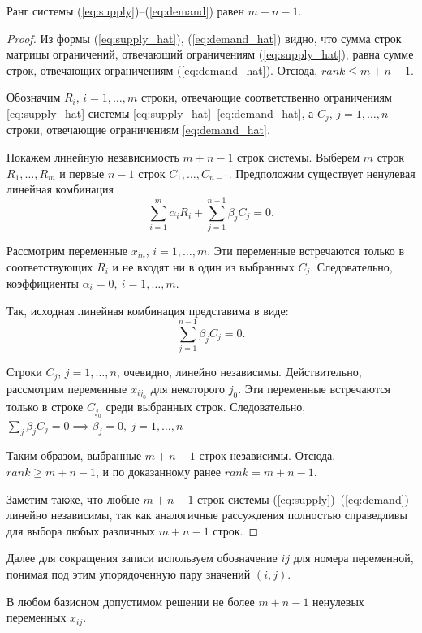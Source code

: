 \documentclass[12pt]{article}
\theoremstyle{definition}
\theoremstyle{plain}
\theoremstyle{definition}
\begin{document}
\begin{assertionlocal}\label{assert:rank}
Ранг системы (\ref{eq:supply})--(\ref{eq:demand}) равен $m + n - 1$.
\end{assertionlocal}
\begin{proof}
  Из формы (\ref{eq:supply_hat}), (\ref{eq:demand_hat}) видно,
  что сумма строк матрицы ограничений, отвечающий ограничениям (\ref{eq:supply_hat}),
  равна сумме строк, отвечающих ограничениям (\ref{eq:demand_hat}). Отсюда, $rank \leq m + n - 1$.

Обозначим $R_i$, $i=1,\dots,m$ строки, отвечающие соответственно ограничениям \eqref{eq:supply_hat}
системы \eqref{eq:supply_hat}--\eqref{eq:demand_hat}, а $C_j$, $j=1,\dots,n$ ---
строки, отвечающие ограничениям \eqref{eq:demand_hat}.

Покажем линейную независимость $m + n - 1$ строк системы.
Выберем $m$ строк $R_1,\dots,R_m$ и первые $n-1$ строк $C_1,\dots,C_{n-1}$.  
Предположим существует ненулевая линейная комбинация
\[
\sum_{i=1}^m \alpha_i R_i + \sum_{j=1}^{n-1} \beta_j C_j = 0.
\]

Рассмотрим переменные $x_{i n}$, \: $i=1,\dots,m$.  
Эти переменные встречаются только в соответствующих $R_i$ и не входят ни в один из выбранных $C_j$.  
Следовательно, коэффициенты $\alpha_i = 0, \: i=1,\dots,m$.

Так, исходная линейная комбинация представима в виде:
\[
\sum_{j=1}^{n-1} \beta_j C_j = 0.
\]

Строки $C_j$, $j=1,\dots,n$, очевидно, линейно независимы. Действительно, рассмотрим переменные
$x_{i j_0}$ для некоторого $j_0$.
Эти переменные встречаются только в строке $C_{j_0}$ среди выбранных строк.  
Следовательно, $\sum_j \beta_j C_j = 0 \implies \beta_j = 0, \: j=1,\dots,n$

Таким образом, выбранные $m+n-1$ строк независимы. Отсюда, $rank \geq m + n - 1$,
и по доказанному ранее $rank = m + n - 1$.

Заметим также, что любые $m+n-1$ строк системы (\ref{eq:supply})--(\ref{eq:demand}) линейно независимы,
так как аналогичные рассуждения полностью справедливы для выбора любых различных $m+n-1$ строк.
\end{proof}

Далее для сокращения записи используем обозначение $ij$ для номера переменной,
понимая под этим упорядоченную пару значений $(i,j)$.

\begin{corollarylocal}\label{corollary:cbase}
В любом базисном допустимом решении не более $m + n - 1$ ненулевых переменных $x_{ij}$.
\end{corollarylocal}
\end{document}
